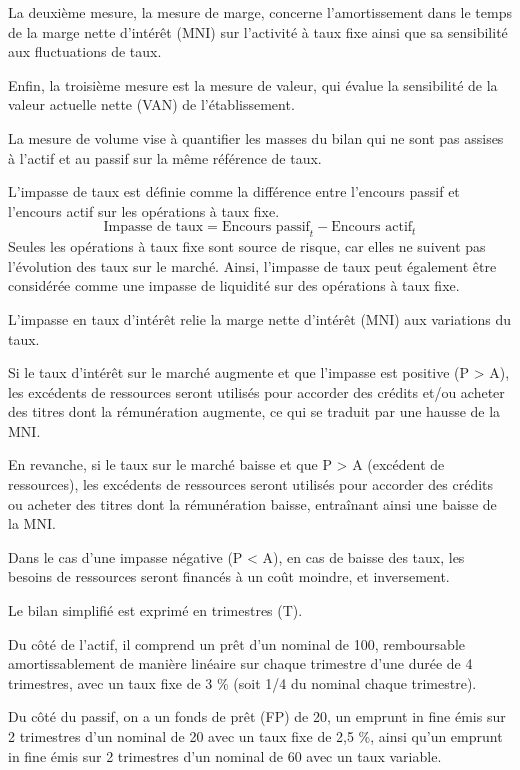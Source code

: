 \documentclass[a4paper, 12pt]{report}
\begin{document}
La deuxième mesure, la mesure de marge, concerne l'amortissement dans le temps de la marge nette d'intérêt (MNI) sur l'activité à taux fixe ainsi que sa sensibilité aux fluctuations de taux.

Enfin, la troisième mesure est la mesure de valeur, qui évalue la sensibilité de la valeur actuelle nette (VAN) de l'établissement.

La mesure de volume vise à quantifier les masses du bilan qui ne sont pas assises à l’actif et au passif sur la même référence de taux. 

L'impasse de taux est définie comme la différence entre l'encours passif et l'encours actif sur les opérations à taux fixe. 
\[
\text{Impasse de taux} = \text{Encours passif}_t - \text{Encours actif}_t
\]
Seules les opérations à taux fixe sont source de risque, car elles ne suivent pas l’évolution des taux sur le marché. Ainsi, l'impasse de taux peut également être considérée comme une impasse de liquidité sur des opérations à taux fixe.

L'impasse en taux d’intérêt relie la marge nette d'intérêt (MNI) aux variations du taux. 

Si le taux d’intérêt sur le marché augmente et que l’impasse est positive (P > A), les excédents de ressources seront utilisés pour accorder des crédits et/ou acheter des titres dont la rémunération augmente, ce qui se traduit par une hausse de la MNI. 

En revanche, si le taux sur le marché baisse et que P > A (excédent de ressources), les excédents de ressources seront utilisés pour accorder des crédits ou acheter des titres dont la rémunération baisse, entraînant ainsi une baisse de la MNI.

Dans le cas d’une impasse négative (P < A), en cas de baisse des taux, les besoins de ressources seront financés à un coût moindre, et inversement.

Le bilan simplifié est exprimé en trimestres (T). 

Du côté de l'actif, il comprend un prêt d’un nominal de 100, remboursable amortissablement de manière linéaire sur chaque trimestre d’une durée de 4 trimestres, avec un taux fixe de 3 \% (soit 1/4 du nominal chaque trimestre).

Du côté du passif, on a un fonds de prêt (FP) de 20, un emprunt in fine émis sur 2 trimestres d’un nominal de 20 avec un taux fixe de 2,5 \%, ainsi qu’un emprunt in fine émis sur 2 trimestres d’un nominal de 60 avec un taux variable.
\end{document}
